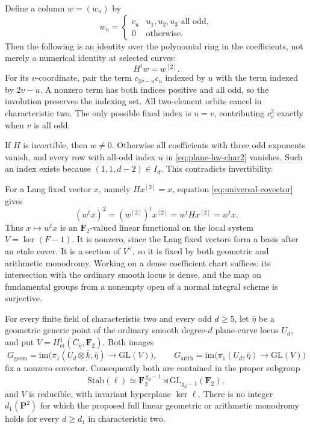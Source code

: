 Define a column $w=(w_u)$ by
\[
 w_u=\begin{cases}c_u&u_1,u_2,u_3\text{ all odd},\\0&\text{otherwise}.
 \end{cases}
\]
Then the following is an identity over the polynomial ring in the
coefficients, not merely a numerical identity at selected curves:
\begin{equation}\label{eq:universal-covector}
 H^t w=w^{[2]}.
\end{equation}
For its $v$-coordinate, pair the term $c_{2v-u}c_u$ indexed by $u$
with the term indexed by $2v-u$.  A nonzero term has both indices
positive and all odd, so the involution preserves the indexing set.
All two-element orbits cancel in characteristic two.  The only possible
fixed index is $u=v$, contributing $c_v^2$ exactly when $v$ is all odd.

If $H$ is invertible, then $w\ne0$.  Otherwise all coefficients with
three odd exponents vanish, and every row with all-odd index $u$
in \eqref{eq:plane-hw-char2} vanishes.  Such an index exists because
$(1,1,d-2)\in I_d$.  This contradicts invertibility.

For a Lang fixed vector $x$, namely $Hx^{[2]}=x$, equation
\eqref{eq:universal-covector} gives
\[
 (w^tx)^2=(w^{[2]})^tx^{[2]}=w^tHx^{[2]}=w^tx.
\]
Thus $x\mapsto w^tx$ is an $\mathbf F_2$-valued linear functional on
the local system $V=\ker(F-1)$.  It is nonzero, since the Lang fixed
vectors form a basis after an etale cover.  It is a section of
$V^\vee$, so it is fixed by both geometric and arithmetic monodromy.
Working on a dense coefficient chart suffices: its intersection with
the ordinary smooth locus is dense, and the map on fundamental groups
from a nonempty open of a normal integral scheme is surjective.

\begin{theorem}\label{thm:odd-plane-char2-obstruction}
For every finite field of characteristic two and every odd $d\geq5$,
let $\bar\eta$ be a geometric generic point of the ordinary smooth
degree-$d$ plane-curve locus $U_d$, and put
$V=H^1_{\mathrm{et}}(C_{\bar\eta},\mathbf F_2)$.
Both images
\[
 G_{\mathrm{geom}}=\mathrm{im}\bigl(\pi_1(U_d\otimes\bar k,\bar\eta)
 \to\mathrm{GL}(V)\bigr),\qquad
 G_{\mathrm{arith}}=\mathrm{im}\bigl(\pi_1(U_d,\bar\eta)
 \to\mathrm{GL}(V)\bigr)
\]
fix a nonzero covector.  Consequently both are contained in the
proper subgroup
\[
 \mathrm{Stab}(\ell)\simeq
 \mathbf F_2^{\,g_d-1}\rtimes\mathrm{GL}_{g_d-1}(\mathbf F_2),
\]
and $V$ is reducible, with invariant hyperplane $\ker\ell$.
There is no integer $d_1(\mathbf P^2)$ for which the proposed full
linear geometric or arithmetic monodromy holds for every $d\geq d_1$
in characteristic two.
\end{theorem}

